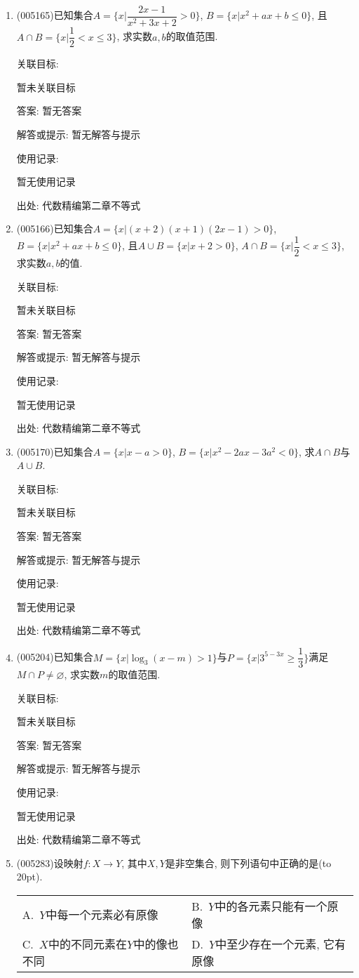 \documentclass[10pt,a4paper]{article}
\newcommand{\bracket}[1]{(\hbox to #1pt{})}
\newcommand{\twoch}[4]{\par\begin{tabular}{p{.46\textwidth}p{.46\textwidth}}
A.~#1& B.~#2\\
C.~#3& D.~#4
\end{tabular}}
\begin{document}
\begin{enumerate}[1.]
暂未关联目标

答案: 暂无答案

解答或提示: 暂无解答与提示

使用记录:

暂无使用记录


出处: 代数精编第二章不等式
\item { (005165)}已知集合$A=\{x|\dfrac{2x-1}{x^2+3x+2}>0\}$, $B=\{x|x^2+ax+b\le 0\}$, 且$A\cap B=\{x|\dfrac 12<x\le 3\}$, 求实数$a,b$的取值范围.


关联目标:

暂未关联目标

答案: 暂无答案

解答或提示: 暂无解答与提示

使用记录:

暂无使用记录


出处: 代数精编第二章不等式
\item { (005166)}已知集合$A=\{x|(x+2)(x+1)(2x-1)>0\}$, $B=\{x|x^2+ax+b\le 0\}$, 且$A\cup B=\{x|x+2 >0\}$, $A\cap B=\{x|\dfrac 12<x\le 3\}$, 求实数$a,b$的值.


关联目标:

暂未关联目标

答案: 暂无答案

解答或提示: 暂无解答与提示

使用记录:

暂无使用记录


出处: 代数精编第二章不等式
\item { (005170)}已知集合$A=\{x|x-a>0\}$, $B=\{x|x^2-2ax-3a^2<0\}$, 求$A\cap B$与$A\cup B$.


关联目标:

暂未关联目标

答案: 暂无答案

解答或提示: 暂无解答与提示

使用记录:

暂无使用记录


出处: 代数精编第二章不等式
\item { (005204)}已知集合$M=\{x|\log_3(x-m)>1\}$与$P=\{x|3^{5-3x} \ge \dfrac 13\}$满足$M\cap P\ne \varnothing$, 求实数$m$的取值范围.


关联目标:

暂未关联目标

答案: 暂无答案

解答或提示: 暂无解答与提示

使用记录:

暂无使用记录


出处: 代数精编第二章不等式
\item { (005283)}设映射$f:X\to Y$, 其中$X,Y$是非空集合, 则下列语句中正确的是\bracket{20}.
\twoch{$Y$中每一个元素必有原像}{$Y$中的各元素只能有一个原像}{$X$中的不同元素在$Y$中的像也不同}{$Y$中至少存在一个元素, 它有原像}



\end{enumerate}
\end{document}
